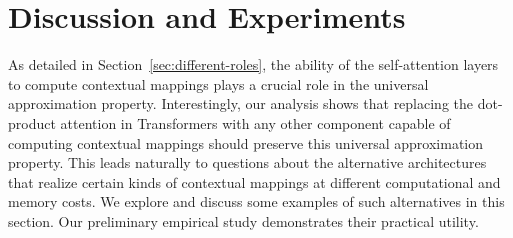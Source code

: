 \vspace*{-6pt}
\section{Discussion and Experiments}\label{sec:discussion}
\vspace*{-4pt}
As detailed in Section~\ref{sec:different-roles}, the ability of the self-attention layers to compute contextual mappings plays a crucial role in the universal approximation property. Interestingly, our analysis shows that replacing the dot-product attention in Transformers with any other component capable of computing contextual mappings should preserve this universal approximation property. This leads naturally to questions about the alternative architectures that realize certain kinds of contextual mappings at different computational and memory costs. 
We explore and discuss some examples of such alternatives in this section.
Our preliminary empirical study demonstrates their practical utility.


\vspace*{-5pt}
